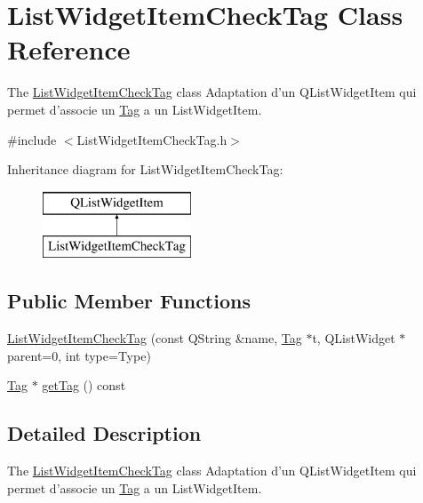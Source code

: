 \hypertarget{class_list_widget_item_check_tag}{\section{List\-Widget\-Item\-Check\-Tag Class Reference}
\label{class_list_widget_item_check_tag}
}


The \hyperlink{class_list_widget_item_check_tag}{List\-Widget\-Item\-Check\-Tag} class Adaptation d'un Q\-List\-Widget\-Item qui permet d'associe un \hyperlink{class_tag}{Tag} a un List\-Widget\-Item.  




{\ttfamily \#include $<$List\-Widget\-Item\-Check\-Tag.\-h$>$}

Inheritance diagram for List\-Widget\-Item\-Check\-Tag\-:\begin{figure}[H]
\begin{center}
\leavevmode
\includegraphics[height=2.000000cm]{class_list_widget_item_check_tag}
\end{center}
\end{figure}
\subsection*{Public Member Functions}
\begin{DoxyCompactItemize}
\item 
\hyperlink{class_list_widget_item_check_tag_ac165440095e9e856ac5879ad9fe50d2a}{List\-Widget\-Item\-Check\-Tag} (const Q\-String \&name, \hyperlink{class_tag}{Tag} $\ast$t, Q\-List\-Widget $\ast$parent=0, int type=Type)
\item 
\hyperlink{class_tag}{Tag} $\ast$ \hyperlink{class_list_widget_item_check_tag_a9d4c4ea2bed4d3817b0b3e7dc77d28ea}{get\-Tag} () const 
\end{DoxyCompactItemize}


\subsection{Detailed Description}
The \hyperlink{class_list_widget_item_check_tag}{List\-Widget\-Item\-Check\-Tag} class Adaptation d'un Q\-List\-Widget\-Item qui permet d'associe un \hyperlink{class_tag}{Tag} a un List\-Widget\-Item. 

